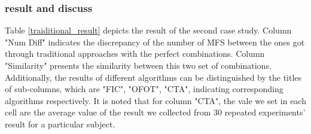 \documentclass{sig-alternate}
\begin{document}
\subsubsection{result and discuss}
Table \ref{traiditional_result} depicts the result of the second case study. Column "Num Diff" indicates the discrepancy of the number of MFS between the ones got through traditional approaches with the perfect combinations. Column "Similarity" presents the similarity between this two set of combinations. Additionally, the results of different algorithms can be distinguished by the titles of sub-columns, which are "FIC", "OFOT", "CTA", indicating corresponding algorithms respectively. It is noted that for column "CTA", the vale we set in each cell are the average value of the result we collected from 30 repeated experiments' result for a particular subject.
%
%
%
%
%
%
%
%
%
%
%
%
%
%
%
\end{document}
